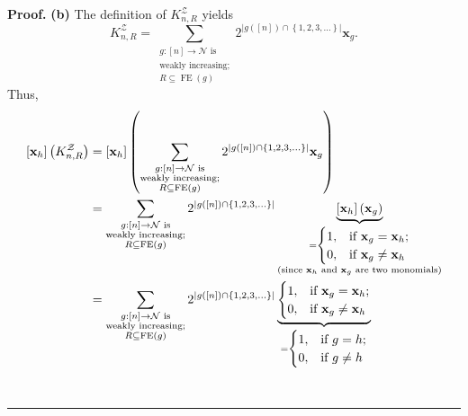 \documentclass[numbers=enddot,12pt,final,onecolumn,notitlepage]{scrartcl}%
\theoremstyle{definition}
\newenvironment{proof}[1][Proof]{\noindent\textbf{#1.} }{\ \rule{0.5em}{0.5em}}
\newenvironment{verlong}{}{}
\let\sumnonlimits\sum
\renewcommand{\sum}{\sumnonlimits\limits}
\begin{document}
\begin{verlong}
\begin{proof}
\textbf{(b)} The definition of $K_{n,R}^{\mathcal{Z}}$ yields%
\[
K_{n,R}^{\mathcal{Z}}=\sum_{\substack{g:\left[  n\right]  \rightarrow
\mathcal{N}\text{ is}\\\text{weakly increasing;}\\R\subseteq\operatorname*{FE}%
\left(  g\right)  }}2^{\left\vert g\left(  \left[  n\right]  \right)
\cap\left\{  1,2,3,\ldots\right\}  \right\vert }\mathbf{x}_{g}.
\]
Thus,%
\begin{align*}
\left[  \mathbf{x}_{h}\right]  \left(  K_{n,R}^{\mathcal{Z}}\right)   &
=\left[  \mathbf{x}_{h}\right]  \left(  \sum_{\substack{g:\left[  n\right]
\rightarrow\mathcal{N}\text{ is}\\\text{weakly increasing;}\\R\subseteq
\operatorname*{FE}\left(  g\right)  }}2^{\left\vert g\left(  \left[  n\right]
\right)  \cap\left\{  1,2,3,\ldots\right\}  \right\vert }\mathbf{x}_{g}\right)
\\
&  =\sum_{\substack{g:\left[  n\right]  \rightarrow\mathcal{N}\text{
is}\\\text{weakly increasing;}\\R\subseteq\operatorname*{FE}\left(  g\right)
}}2^{\left\vert g\left(  \left[  n\right]  \right)  \cap\left\{
1,2,3,\ldots\right\}  \right\vert }\underbrace{\left[  \mathbf{x}_{h}\right]
\left(  \mathbf{x}_{g}\right)  }_{\substack{=%
\begin{cases}
1, & \text{if }\mathbf{x}_{g}=\mathbf{x}_{h};\\
0, & \text{if }\mathbf{x}_{g}\neq\mathbf{x}_{h}%
\end{cases}
\\\text{(since }\mathbf{x}_{h}\text{ and }\mathbf{x}_{g}\text{ are two
monomials)}}}\\
&  =\sum_{\substack{g:\left[  n\right]  \rightarrow\mathcal{N}\text{
is}\\\text{weakly increasing;}\\R\subseteq\operatorname*{FE}\left(  g\right)
}}2^{\left\vert g\left(  \left[  n\right]  \right)  \cap\left\{
1,2,3,\ldots\right\}  \right\vert }\underbrace{%
\begin{cases}
1, & \text{if }\mathbf{x}_{g}=\mathbf{x}_{h};\\
0, & \text{if }\mathbf{x}_{g}\neq\mathbf{x}_{h}%
\end{cases}
}_{\substack{=%
\begin{cases}
1, & \text{if }g=h;\\
0, & \text{if }g\neq h
\end{cases}
}}
\end{align*}
\end{proof}
\end{verlong}
\end{document}
